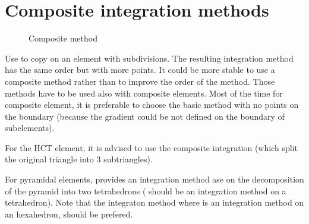 \documentclass[a4paper,11pt,english]{sphinxmanual}
\begin{document}
\section{Composite integration methods}
\label{\detokenize{userdoc/appendixB:composite-integration-methods}}
\begin{figure}[htbp]
\centering
\capstart

\noindent{}
\caption{Composite method }\label{\detokenize{userdoc/appendixB:id13}}\label{\detokenize{userdoc/appendixB:ud-fig-triangle-compcinq}}\end{figure}

Use  to copy  on an element with 
subdivisions. The resulting integration method has the same order but with more
points. It could be more stable to use a composite method rather than to improve
the order of the method. Those methods have to be used also with composite
elements. Most of the time for composite element, it is preferable to choose the
basic method  with no points on the boundary (because the gradient could be
not defined on the boundary of sub\sphinxhyphen{}elements).

For the HCT element, it is advised to use the  composite
integration (which split the original triangle into 3 sub\sphinxhyphen{}triangles).

For pyramidal elements,  provides an integration method ase on the decomposition of the pyramid into two tetrahedrons ( should be an integration method on a tetrahedron). Note that the integraton method  where  is an integration method on an hexahedron, should be prefered.
\end{document}
